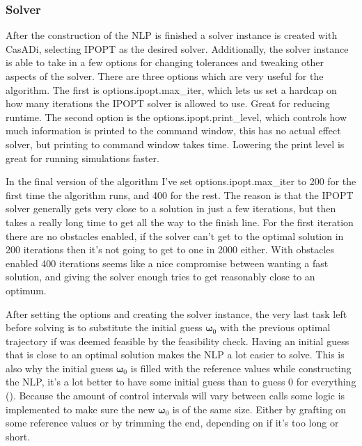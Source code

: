 \subsubsection*{Solver}
After the construction of the \gls{NLP} is finished a solver instance is created with CasADi, selecting \gls{IPOPT}
as the desired solver. Additionally, the solver instance is able to take in a few options for changing tolerances
and tweaking other aspects of the solver. There are three options which are very useful for the algorithm. 
The first is options.ipopt.max\_iter, which lets us set a hardcap on how many iterations the \gls{IPOPT} solver is 
allowed to use. Great for reducing runtime. The second option is the options.ipopt.print\_level, which controls 
how much information is printed to the command window, this has no actual effect solver, 
but printing to command window takes time. Lowering the print level is great for running simulations faster.

In the final version of the algorithm I've set options.ipopt.max\_iter to 200 for the first time 
the algorithm runs, and 400 for the rest. The reason is that the \gls{IPOPT} solver generally gets very close
to a solution in just a few iterations, but then takes a really long time to get all the way to the finish line.
For the first iteration there are no obstacles enabled, if the solver can't get to the optimal solution in 200 iterations
then it's not going to get to one in 2000 either. With obstacles enabled 400 iterations seems like a nice compromise between
wanting a fast solution, and giving the solver enough tries to get reasonably close to an optimum. 

After setting the options and creating the solver instance, the very last task left before solving is to
substitute the initial guess $\bm{\omega}_0$ with the previous optimal trajectory if was deemed feasible
by the feasibility check. Having an initial guess that is close to an optimal solution makes the \gls{NLP}
a lot easier to solve. This is also why the initial guess $\bm{\omega}_0$ is filled with the reference values while
constructing the NLP, it's a lot better to have some initial guess than to guess 0 for everything (\cite{gros2017Lecture}).
Because the amount of control intervals will vary between calls some logic is implemented to make sure the new
$\bm{\omega}_0$ is of the same size. Either by grafting on some reference values or by trimming the end, depending on
if it's too long or short.

